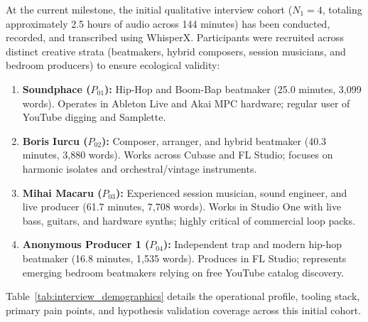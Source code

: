 At the current milestone, the initial qualitative interview cohort ($N_1 = 4$, totaling approximately 2.5 hours of audio across 144 minutes) has been conducted, recorded, and transcribed using WhisperX. Participants were recruited across distinct creative strata (beatmakers, hybrid composers, session musicians, and bedroom producers) to ensure ecological validity:
\begin{enumerate}
    \item \textbf{Soundphace ($P_{01}$):} Hip-Hop and Boom-Bap beatmaker (25.0 minutes, 3,099 words). Operates in Ableton Live and Akai MPC hardware; regular user of YouTube digging and Samplette.
    \item \textbf{Boris Iurcu ($P_{02}$):} Composer, arranger, and hybrid beatmaker (40.3 minutes, 3,880 words). Works across Cubase and FL Studio; focuses on harmonic isolates and orchestral/vintage instruments.
    \item \textbf{Mihai Macaru ($P_{03}$):} Experienced session musician, sound engineer, and live producer (61.7 minutes, 7,708 words). Works in Studio One with live bass, guitars, and hardware synths; highly critical of commercial loop packs.
    \item \textbf{Anonymous Producer 1 ($P_{04}$):} Independent trap and modern hip-hop beatmaker (16.8 minutes, 1,535 words). Produces in FL Studio; represents emerging bedroom beatmakers relying on free YouTube catalog discovery.
\end{enumerate}

Table~\ref{tab:interview_demographics} details the operational profile, tooling stack, primary pain points, and hypothesis validation coverage across this initial cohort.

